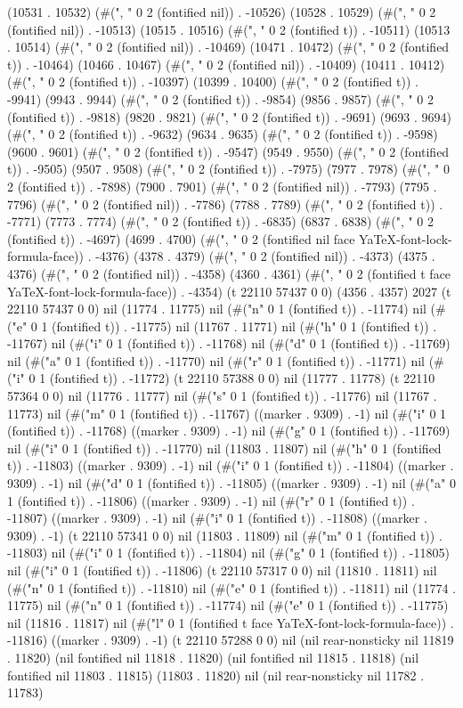 (10531 . 10532) (#(", " 0 2 (fontified nil)) . -10526) (10528 . 10529) (#(", " 0 2 (fontified nil)) . -10513) (10515 . 10516) (#(", " 0 2 (fontified t)) . -10511) (10513 . 10514) (#(", " 0 2 (fontified nil)) . -10469) (10471 . 10472) (#(", " 0 2 (fontified t)) . -10464) (10466 . 10467) (#(", " 0 2 (fontified nil)) . -10409) (10411 . 10412) (#(", " 0 2 (fontified t)) . -10397) (10399 . 10400) (#(", " 0 2 (fontified t)) . -9941) (9943 . 9944) (#(", " 0 2 (fontified t)) . -9854) (9856 . 9857) (#(", " 0 2 (fontified t)) . -9818) (9820 . 9821) (#(", " 0 2 (fontified t)) . -9691) (9693 . 9694) (#(", " 0 2 (fontified t)) . -9632) (9634 . 9635) (#(", " 0 2 (fontified t)) . -9598) (9600 . 9601) (#(", " 0 2 (fontified t)) . -9547) (9549 . 9550) (#(", " 0 2 (fontified t)) . -9505) (9507 . 9508) (#(", " 0 2 (fontified t)) . -7975) (7977 . 7978) (#(", " 0 2 (fontified t)) . -7898) (7900 . 7901) (#(", " 0 2 (fontified nil)) . -7793) (7795 . 7796) (#(", " 0 2 (fontified nil)) . -7786) (7788 . 7789) (#(", " 0 2 (fontified t)) . -7771) (7773 . 7774) (#(", " 0 2 (fontified t)) . -6835) (6837 . 6838) (#(", " 0 2 (fontified t)) . -4697) (4699 . 4700) (#(", " 0 2 (fontified nil face YaTeX-font-lock-formula-face)) . -4376) (4378 . 4379) (#(", " 0 2 (fontified nil)) . -4373) (4375 . 4376) (#(", " 0 2 (fontified nil)) . -4358) (4360 . 4361) (#(", " 0 2 (fontified t face YaTeX-font-lock-formula-face)) . -4354) (t 22110 57437 0 0) (4356 . 4357) 2027 (t 22110 57437 0 0) nil (11774 . 11775) nil (#("n" 0 1 (fontified t)) . -11774) nil (#("e" 0 1 (fontified t)) . -11775) nil (11767 . 11771) nil (#("h" 0 1 (fontified t)) . -11767) nil (#("i" 0 1 (fontified t)) . -11768) nil (#("d" 0 1 (fontified t)) . -11769) nil (#("a" 0 1 (fontified t)) . -11770) nil (#("r" 0 1 (fontified t)) . -11771) nil (#("i" 0 1 (fontified t)) . -11772) (t 22110 57388 0 0) nil (11777 . 11778) (t 22110 57364 0 0) nil (11776 . 11777) nil (#("s" 0 1 (fontified t)) . -11776) nil (11767 . 11773) nil (#("m" 0 1 (fontified t)) . -11767) ((marker . 9309) . -1) nil (#("i" 0 1 (fontified t)) . -11768) ((marker . 9309) . -1) nil (#("g" 0 1 (fontified t)) . -11769) nil (#("i" 0 1 (fontified t)) . -11770) nil (11803 . 11807) nil (#("h" 0 1 (fontified t)) . -11803) ((marker . 9309) . -1) nil (#("i" 0 1 (fontified t)) . -11804) ((marker . 9309) . -1) nil (#("d" 0 1 (fontified t)) . -11805) ((marker . 9309) . -1) nil (#("a" 0 1 (fontified t)) . -11806) ((marker . 9309) . -1) nil (#("r" 0 1 (fontified t)) . -11807) ((marker . 9309) . -1) nil (#("i" 0 1 (fontified t)) . -11808) ((marker . 9309) . -1) (t 22110 57341 0 0) nil (11803 . 11809) nil (#("m" 0 1 (fontified t)) . -11803) nil (#("i" 0 1 (fontified t)) . -11804) nil (#("g" 0 1 (fontified t)) . -11805) nil (#("i" 0 1 (fontified t)) . -11806) (t 22110 57317 0 0) nil (11810 . 11811) nil (#("n" 0 1 (fontified t)) . -11810) nil (#("e" 0 1 (fontified t)) . -11811) nil (11774 . 11775) nil (#("n" 0 1 (fontified t)) . -11774) nil (#("e" 0 1 (fontified t)) . -11775) nil (11816 . 11817) nil (#("l" 0 1 (fontified t face YaTeX-font-lock-formula-face)) . -11816) ((marker . 9309) . -1) (t 22110 57288 0 0) nil (nil rear-nonsticky nil 11819 . 11820) (nil fontified nil 11818 . 11820) (nil fontified nil 11815 . 11818) (nil fontified nil 11803 . 11815) (11803 . 11820) nil (nil rear-nonsticky nil 11782 . 11783) 